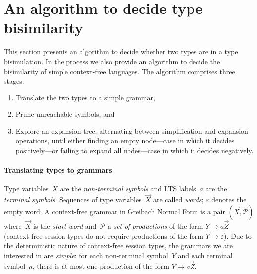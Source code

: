 \section{An algorithm to decide type bisimilarity}
\label{sec:algorithm}



This section presents an algorithm to decide whether two types are in
a type bisimulation. In the process we also provide an algorithm to
decide the bisimilarity of simple context-free languages.
%
The algorithm comprises three stages:
%
\begin{enumerate}
\item Translate the two types to a simple grammar,
\item Prune unreachable symbols, and
\item Explore an expansion tree, alternating between simplification
  and expansion operations, until either finding an empty node---case
  in which it decides positively---or failing to expand all nodes---case
  in which it decides negatively.
\end{enumerate}

\paragraph{Translating types to grammars}


Type variables~$X$ are the \emph{non-terminal symbols} and LTS
labels~$a$ are the \emph{terminal symbols}. Sequences of type
variables~$\vec X$ are called \emph{words}; $\varepsilon$ denotes the
empty word.
%
A context-free grammar in Greibach Normal Form is a pair
$(\vec X,\mathcal P)$ where~$\vec X$ is the \emph{start word}
and~$\mathcal P$ a \emph{set of productions} of the form
$Y \rightarrow a\vec Z$ (context-free session types do not require
productions of the form $Y \rightarrow\varepsilon$).
%
Due to the deterministic nature of context-free session types, the
grammars we are interested in are \emph{simple}: for each
non-terminal symbol~$Y$ and each terminal symbol~$a$, there is at most
one production of the form $Y \rightarrow a\vec Z$.

